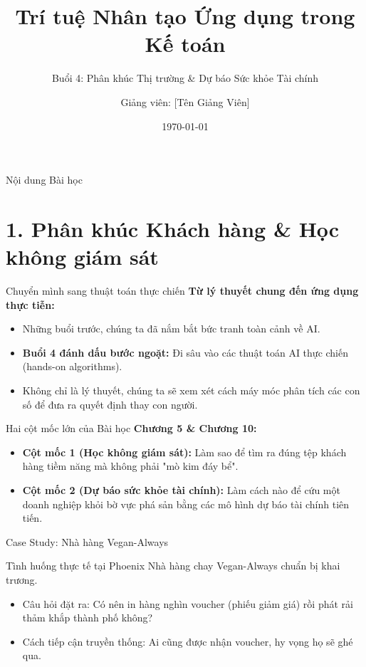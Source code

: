 \documentclass[aspectratio=169]{beamer}
\title[TTNT trong Kế toán - Buổi 4]{Trí tuệ Nhân tạo Ứng dụng trong Kế toán}
\subtitle{Buổi 4: Phân khúc Thị trường \& Dự báo Sức khỏe Tài chính}
\author{Giảng viên: [Tên Giảng Viên]}
\institute{Đại học Đông Á}
\date{\today}
\begin{document}
\begin{frame}
    \titlepage
\end{frame}

\begin{frame}{Nội dung Bài học}
    \tableofcontents
\end{frame}

\section{1. Phân khúc Khách hàng \& Học không giám sát}

\begin{frame}{Chuyển mình sang thuật toán thực chiến}
    \textbf{Từ lý thuyết chung đến ứng dụng thực tiễn:}
    \begin{itemize}
        \item Những buổi trước, chúng ta đã nắm bắt bức tranh toàn cảnh về AI.
        \item \textbf{Buổi 4 đánh dấu bước ngoặt:} Đi sâu vào các thuật toán AI thực chiến (hands-on algorithms).
        \item Không chỉ là lý thuyết, chúng ta sẽ xem xét cách máy móc phân tích các con số để đưa ra quyết định thay con người.
    \end{itemize}
\end{frame}

\begin{frame}{Hai cột mốc lớn của Bài học}
    \textbf{Chương 5 \& Chương 10:}
    \begin{itemize}
        \item \textbf{Cột mốc 1 (Học không giám sát):} Làm sao để tìm ra đúng tệp khách hàng tiềm năng mà không phải "mò kim đáy bể".
        \item \textbf{Cột mốc 2 (Dự báo sức khỏe tài chính):} Làm cách nào để cứu một doanh nghiệp khỏi bờ vực phá sản bằng các mô hình dự báo tài chính tiên tiến.
    \end{itemize}
\end{frame}

\begin{frame}{Case Study: Nhà hàng Vegan-Always}
    \begin{block}{Tình huống thực tế tại Phoenix}
        Nhà hàng chay Vegan-Always chuẩn bị khai trương. 
        \begin{itemize}
            \item Câu hỏi đặt ra: Có nên in hàng nghìn voucher (phiếu giảm giá) rồi phát rải thảm khắp thành phố không?
            \item Cách tiếp cận truyền thống: Ai cũng được nhận voucher, hy vọng họ sẽ ghé qua.
        \end{itemize}
    \end{block}
\end{frame}
\end{document}
